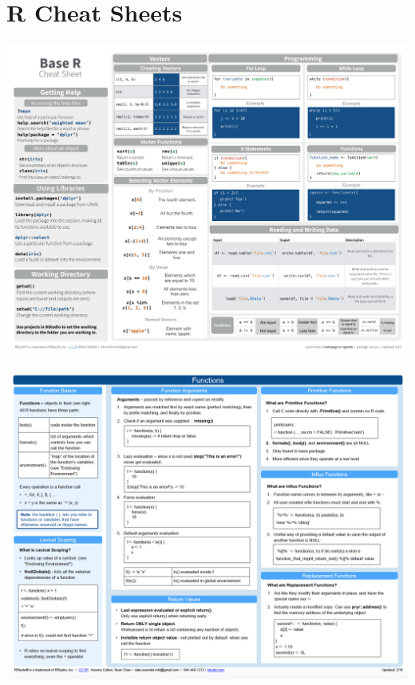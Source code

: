 \documentclass[
]{book}
\theoremstyle{definition}
\theoremstyle{definition}
\theoremstyle{definition}
\theoremstyle{definition}
\theoremstyle{remark}
\begin{document}
\hypertarget{r-cheat-sheets}{%
\section*{R Cheat Sheets}\label{r-cheat-sheets}}

\begin{center}\includegraphics{Figures/R-cheat-sheet} \end{center}

\begin{center}\includegraphics{Figures/R-cheat-sheet2} \end{center}
\end{document}
